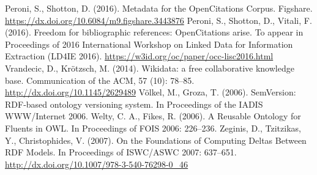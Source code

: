 \documentclass[runningheads,a4paper]{llncs}
\begin{document}
\begin{thebibliography}{4}
 Peroni, S., Shotton, D. (2016). Metadata for the OpenCitations Corpus. Figshare. \url{https://dx.doi.org/10.6084/m9.figshare.3443876}
 Peroni, S., Shotton, D., Vitali, F. (2016). Freedom for bibliographic references: OpenCitations arise. To appear in Proceedings of 2016 International Workshop on Linked Data for Information Extraction (LD4IE 2016). \url{https://w3id.org/oc/paper/occ-lisc2016.html}
 Vrandecic, D., Krötzsch, M. (2014). Wikidata: a free collaborative knowledge base. Communication of the ACM, 57 (10): 78--85. \url{http://dx.doi.org/10.1145/2629489}
 Völkel, M., Groza, T. (2006). SemVersion: RDF-based ontology versioning system. In Proceedings of the IADIS WWW/Internet 2006. 
 Welty, C. A., Fikes, R. (2006). A Reusable Ontology for Fluents in OWL. In Proceedings of FOIS 2006: 226--236.
 Zeginis, D., Tzitzikas, Y., Christophides, V. (2007). On the Foundations of Computing Deltas Between RDF Models. In Proceedings of ISWC/ASWC 2007: 637--651. \url{http://dx.doi.org/10.1007/978-3-540-76298-0\_46}

\end{thebibliography}
\end{document}
